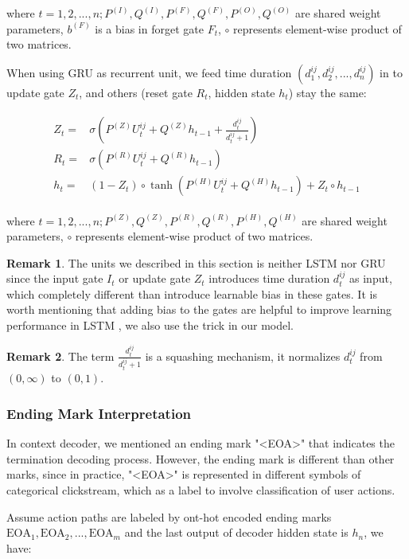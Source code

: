 where $t = 1, 2, ..., n; P^{(I)}, Q^{(I)}, P^{(F)}, Q^{(F)}, P^{(O)}, Q^{(O)}$ are shared weight parameters, 
$b^{(F)}$ is a bias in forget gate $F_t$,
$\circ$ represents element-wise product of two matrices.

When using GRU as recurrent unit, we feed time duration $(d^{ij}_1, d^{ij}_2, ..., d^{ij}_n)$
in to update gate $Z_t$, and others (reset gate $R_t$, hidden state $h_t$) stay the same:

\begin{align}
\label{eqn:lstm}
\begin{split}
    Z_t =& \sigma ( P^{(Z)} U^{ij}_t + Q^{(Z)} h_{t-1} + \frac{d^{ij}_t}{d^{ij}_t + 1} ) \\
    R_t =& \sigma ( P^{(R)} U^{ij}_t + Q^{(R)} h_{t-1} ) \\
    h_t =& ( 1 - Z_t ) \circ \tanh ( P^{(H)} U^{ij}_t + Q^{(H)} h_{t-1} ) + Z_t \circ h_{t-1}
\end{split}
\end{align}

where $t = 1, 2, ..., n; P^{(Z)}, Q^{(Z)}, P^{(R)}, Q^{(R)}, P^{(H)}, Q^{(H)}$ are shared weight parameters, 
$\circ$ represents element-wise product of two matrices.

\textbf{Remark 1}. The units we described in this section is neither LSTM nor GRU since
the input gate $I_t$ or update gate $Z_t$ introduces time duration $d^{ij}_t$ as input,
which completely different than introduce learnable bias in these gates. It is worth mentioning that
adding bias to the gates are helpful to improve learning performance in LSTM
 \cite{Jozefowicz:2015:EER:3045118.3045367}, we also use the trick in our model.

\textbf{Remark 2}. The term $\frac{d^{ij}_t}{d^{ij}_t + 1}$ is a squashing mechanism,
it normalizes $d^{ij}_t$ from $(0, \infty)$ to $(0, 1)$.

\subsubsection{Ending Mark Interpretation}
\label{sec:mark-interpretation}

In context decoder, we mentioned an ending mark "<EOA>" that indicates the termination 
decoding process. However, the ending mark is different than other marks, since in practice,
"<EOA>" is represented in different symbols of categorical clickstream, which as a label to
involve classification of user actions.

Assume action paths are labeled by ont-hot encoded ending marks 
$\text{EOA}_1, \text{EOA}_2, ..., \text{EOA}_m$ and the last output
of decoder hidden state is $h_n$, we have:

